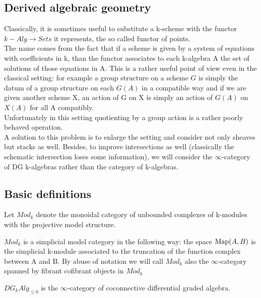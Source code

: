 \begin{refsection}
\section{Derived algebraic geometry}

Classically, it is sometimes useful to substitute a k-scheme with the functor $k-Alg\to Sets$ it represents, the so called functor of points.\\
The name comes from the fact that if a scheme is given by a system of equations with coefficients in k, than the functor associates to each k-algebra A the set
of solutions of those equations in A. This is a rather useful point of view even in the classical setting: for example a group structure on a scheme $G$
is simply the datum of a group structure on each $G(A)$ in a compatible way and if we are given another scheme X, an action of G on X is simply an
action of $G(A)$ on $X(A)$ for all A compatibly.\\
Unfortunately in this setting quotienting by a group action is a rather poorly behaved operation.\\
A solution to this problem is to enlarge the setting and consider not only sheaves but stacks as well. Besides, to improve intersections as well (classically the schematic
intersection loses some information), we will consider the $\infty$-category of DG k-algebras rather than the category of k-algebras.\\

\subsection{Basic definitions}

\begin{defin}
Let $Mod_k$ denote the monoidal category of unbounded complexes of k-modules with the projective model structure.
\end{defin}

\begin{prop}
$Mod_k$ is a simplicial model category in the following way: the space $\operatorname{\mathrm{Map}}(A,B)$ is the simplicial k-module associated to the truncation of the function complex between
A and B. By abuse of notation we will call $Mod_k$ also the $\infty$-category spanned by fibrant cofibrant objects in $Mod_k$
\end{prop}

\begin{defin}
$DG_kAlg_{\le 0}$ is the $\infty$-category of coconnective differential graded algebra.
\end{defin}


\end{refsection}
